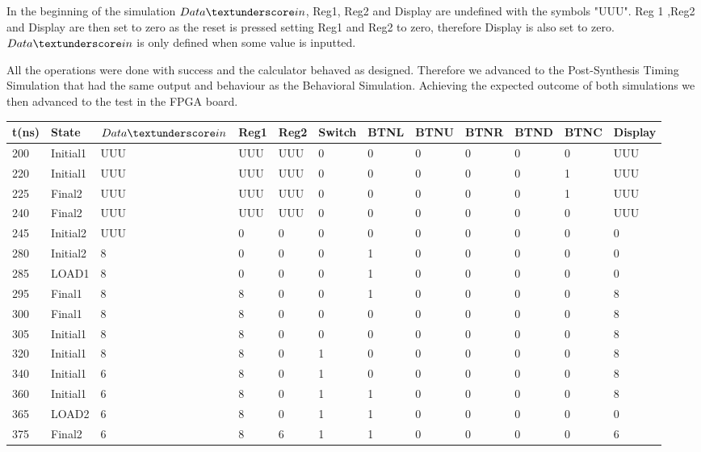 \documentclass[12pt]{article}
\begin{document}
In the beginning of the simulation $Data\textunderscore in$, Reg1, Reg2 and Display are undefined with the symbols "UUU". Reg 1 ,Reg2 and Display are then set to zero as the reset is pressed setting Reg1 and Reg2 to zero, therefore Display is also set to zero. $Data\textunderscore in$ is only defined when some value is inputted. 

All the operations were done with success and the calculator behaved as designed. Therefore we advanced to the Post-Synthesis Timing Simulation that had the same output and behaviour as the Behavioral Simulation. Achieving the expected outcome of both simulations we then advanced to the test in the FPGA board.

\begin{table}[]
   
    \hskip-1.0cm\begin{tabular}{|l|l|l|l|l|l|l|l|l|l|l|l|}
    \hline
        t(ns) & State & $Data\textunderscore in$  & Reg1 & Reg2 & Switch & BTNL & BTNU & BTNR & BTND& BTNC& Display\\
        \hline
        200 & Initial1 & UUU & UUU&UUU&0&0&0&0&0&0&UUU\\
        \hline
         220 & Initial1 & UUU & UUU&UUU&0&0&0&0&0&1&UUU\\
        \hline
         225 & Final2 & UUU & UUU&UUU&0&0&0&0&0&1&UUU\\
        \hline
        240 & Final2 & UUU & UUU&UUU&0&0&0&0&0&0&UUU\\
        \hline
        245 & Initial2 & UUU & 0&0&0&0&0&0&0&0&0\\
        \hline
        280 & Initial2 & 8 & 0&0&0&1&0&0&0&0&0\\
        \hline
        285 & LOAD1 & 8 & 0&0&0&1&0&0&0&0&0\\
        \hline
        295 & Final1 & 8 & 8&0&0&1&0&0&0&0&8\\
        \hline
        300 & Final1 & 8 & 8&0&0&0&0&0&0&0&8\\
        \hline
        305 & Initial1 & 8 & 8&0&0&0&0&0&0&0&8\\
        \hline
        320 & Initial1 & 8 & 8&0&1&0&0&0&0&0&8\\
        \hline
        340 & Initial1 & 6 & 8&0&1&0&0&0&0&0&8\\
        \hline
        360 & Initial1 & 6 & 8&0&1&1&0&0&0&0&8\\
        \hline
        365 & LOAD2 & 6 & 8&0&1&1&0&0&0&0&0\\
        \hline
        375 & Final2 & 6 & 8&6&1&1&0&0&0&0&6\\

\end{tabular}
\end{table}
\end{document}
